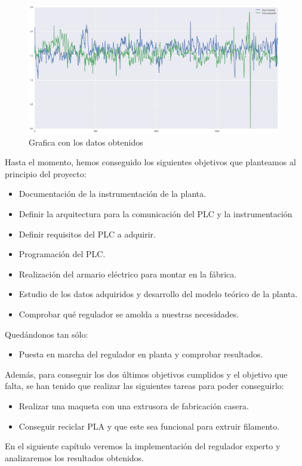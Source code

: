 \begin{figure}[H]
    \centering
    \includegraphics[width=0.99\textwidth]{images/producciones/22072015/output_7_1.png}
    \caption{Grafica con los datos obtenidos }
    \label{fig:22072015-grafica}
\end{figure}

Hasta el momento, hemos conseguido los siguientes objetivos que planteamos al principio del proyecto:

\begin{itemize}
    \item Documentación de la instrumentación de la planta.
    \item Definir la arquitectura para la comunicación del PLC y la instrumentación
    \item Definir requisitos del PLC a adquirir.
    \item Programación del PLC.
    \item Realización del armario eléctrico para montar en la fábrica.
    \item Estudio de los datos adquiridos y desarrollo del modelo teórico de la planta.
    \item Comprobar qué regulador se amolda a nuestras necesidades.
\end{itemize}

Quedándonos tan sólo:

\begin{itemize}
    \item Puesta en marcha del regulador en planta y comprobar resultados.
\end{itemize}

Además, para conseguir los dos últimos objetivos cumplidos y el objetivo que falta, se han tenido que realizar las siguientes tareas para poder conseguirlo:

\begin{itemize}
    \item Realizar una maqueta con una extrusora de fabricación casera.
    \item Conseguir reciclar PLA y que este sea funcional para extruir filamento.
\end{itemize}

En el siguiente capítulo veremos la implementación del regulador experto y analizaremos los resultados obtenidos.
